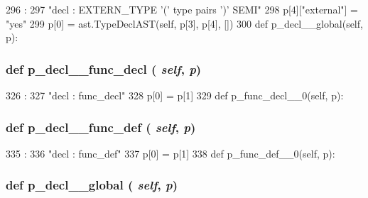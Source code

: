 \begin{DoxyCode}
296                                 :
297         "decl : EXTERN_TYPE '(' type pairs ')' SEMI"
298         p[4]["external"] = "yes"
299         p[0] = ast.TypeDeclAST(self, p[3], p[4], [])
300 
    def p_decl__global(self, p):
\end{DoxyCode}
\hypertarget{classslicc_1_1parser_1_1SLICC_ad66627c6753ceb15be8ff36e20fcb0e1}{
\subsubsection[{p\_\-decl\_\-\_\-func\_\-decl}]{\setlength{\rightskip}{0pt plus 5cm}def p\_\-decl\_\-\_\-func\_\-decl ( {\em self}, \/   {\em p})}}
\label{classslicc_1_1parser_1_1SLICC_ad66627c6753ceb15be8ff36e20fcb0e1}



\begin{DoxyCode}
326                                   :
327         "decl : func_decl"
328         p[0] = p[1]
329 
    def p_func_decl__0(self, p):
\end{DoxyCode}
\hypertarget{classslicc_1_1parser_1_1SLICC_a2f6325df13327674bd0ae4cc328bf0df}{
\subsubsection[{p\_\-decl\_\-\_\-func\_\-def}]{\setlength{\rightskip}{0pt plus 5cm}def p\_\-decl\_\-\_\-func\_\-def ( {\em self}, \/   {\em p})}}
\label{classslicc_1_1parser_1_1SLICC_a2f6325df13327674bd0ae4cc328bf0df}



\begin{DoxyCode}
335                                  :
336         "decl : func_def"
337         p[0] = p[1]
338 
    def p_func_def__0(self, p):
\end{DoxyCode}
\hypertarget{classslicc_1_1parser_1_1SLICC_a2143d33e44dd386c5405c953cf33c8f6}{
\subsubsection[{p\_\-decl\_\-\_\-global}]{\setlength{\rightskip}{0pt plus 5cm}def p\_\-decl\_\-\_\-global ( {\em self}, \/   {\em p})}}
\label{classslicc_1_1parser_1_1SLICC_a2143d33e44dd386c5405c953cf33c8f6}



